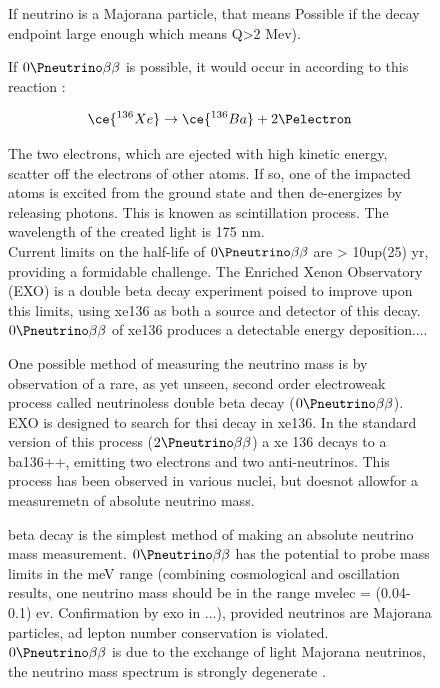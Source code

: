 \begin{figure}[!hbtp]
{{  
  
  If neutrino is a Majorana particle, that means 
 Possible  if the decay endpoint large enough which means Q>2 Mev). 
 
  If \(0\Pneutrino\beta\beta\) is possible, 
  it would occur in  according to this reaction : 
    
  \begin{equation}
    \ce{^{136}Xe} \rightarrow \ce{^{136}Ba} + 2\Pelectron %
  \end{equation}
   
  The two electrons, which are ejected with high kinetic energy, scatter off the electrons of other  atoms. If so, one 
  of the impacted  atoms is excited from the ground state and then de-energizes by releasing photons. 
  This is knowen as scintillation process. The wavelength of the created light is 175 nm. 
  \\
  
  Current limits on the half-life of \(0\Pneutrino\beta\beta\) are > 10up(25) yr, providing a 
  formidable challenge. The Enriched Xenon Observatory (EXO) is a 
  double beta decay experiment poised to improve upon this limits, using
  xe136 as both a source and detector of this decay. \(0\Pneutrino\beta\beta\) of xe136 produces a detectable
  energy deposition....
  
  One possible method of measuring the neutrino mass is by observation of a rare, 
  as yet unseen, second order electroweak process called neutrinoless double 
  beta decay (\(0\Pneutrino\beta\beta\)). \\
  EXO is designed to search for thsi decay in xe136. In the standard version
  of this process (\(2\Pneutrino\beta\beta\)) a xe 136 decays to a ba136++, emitting two electrons and two anti-neutrinos. 
  This process has been observed in various nuclei, but doesnot allowfor a measuremetn
   of absolute neutrino mass. 
   
  
 beta decay is the simplest method of making an absolute neutrino mass measurement. 
 \(0\Pneutrino\beta\beta\) has the potential to probe mass limits in the meV range (combining cosmological and oscillation
 results, one neutrino mass should be in the range mvelec = (0.04-0.1) ev. Confirmation by 
 exo in ...), provided neutrinos are Majorana particles, ad lepton number
 conservation is violated. 
 \(0\Pneutrino\beta\beta\) is  due to the exchange of light Majorana neutrinos, the neutrino mass
 spectrum is strongly degenerate . 
 
}}
\end{figure}
